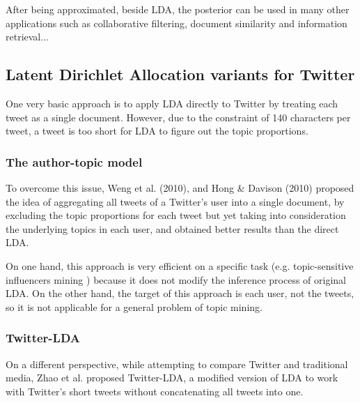 \documentclass[11pt]{article}
\begin{document}
After being approximated, beside LDA, the posterior can be used in many other applications such as collaborative filtering, document similarity and information retrieval...

\subsection{Latent Dirichlet Allocation variants for Twitter} \label{lda_app}

One very basic approach is to apply LDA directly to Twitter by treating each tweet as a single document. However, due to the constraint of 140 characters per tweet, a tweet is too short for LDA to figure out the topic proportions.

\subsubsection{The author-topic model} \label{author_topic}

To overcome this issue, Weng et al. (2010), and Hong \& Davison (2010) \cite{Weng2010,hong2010empirical} proposed the idea of aggregating all tweets of a Twitter's user into a single document, by excluding the topic proportions for each tweet but yet taking into consideration the underlying topics in each user, and obtained better results than the direct LDA.

On one hand, this approach is very efficient on a specific task (e.g. topic-sensitive influencers mining \cite{Weng2010}) because it does not modify the inference process of original LDA. On the other hand, the target of this approach is each user, not the tweets, so it is not applicable for a general problem of topic mining.

\subsubsection{Twitter-LDA} \label{twitter_lda}

On a different perspective, while attempting to compare Twitter and traditional media, Zhao et al. \cite{zhao2011comparing} proposed Twitter-LDA, a modified version of LDA to work with Twitter's short tweets without concatenating all tweets into one.
\end{document}
